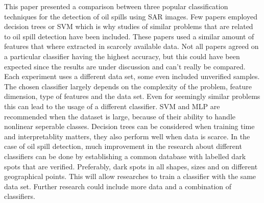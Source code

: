 This paper presented a comparison between three popular classification techniques for the detection of oil spills using SAR images. Few papers employed decision trees or SVM which is why studies of similar problems that are related to oil spill detection have been included. These papers used a similar amount of features that where extracted in scarcely available data. Not all papers agreed on a particular classifier having the highest accuracy, but this could have been expected since the results are under discussion and can't really be compared. Each experiment uses a different data set, some even included unverified samples. The chosen classifier largely depends on the complexity of the problem, feature dimension, type of features and the data set. Even for seemingly similar problems this can lead to the usage of a different classifier. SVM and MLP are recommended when the dataset is large, because of their ability to handle nonlinear seperable classes. Decision trees can be considered when training time and interpretablity matters, they also perform well when data is scarce. In the case of oil spill detection, much improvement in the research about different classifiers can be done by establishing a common database with labelled dark spots that are verified. Preferably, dark spots in all shapes, sizes and on different geographical points. This will allow researches to train a classifier with the same data set. Further research could include more data and a combination of classifiers.